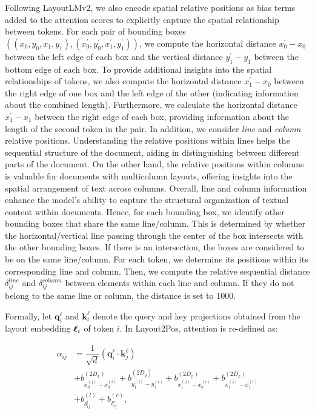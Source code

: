 Following LayoutLMv2, we also encode spatial relative positions as bias terms added to the attention scores to explicitly capture the spatial relationship between tokens. For each pair of bounding boxes $((x_0, y_0, x_1, y_1), (x^{\prime}_0, y^{\prime}_0, x^{\prime}_1, y^{\prime}_1))$, we compute the horizontal distance $x^{\prime}_0 - x_0$ between the left edge of each box and the vertical distance $y^{\prime}_1 - y_1$ between the bottom edge of each box. To provide additional insights into the spatial relationships of tokens, we also compute the horizontal distance $x^{\prime}_1 - x_0$ between the right edge of one box and the left edge of the other (indicating information about the combined length). Furthermore, we calculate the horizontal distance $x^{\prime}_1 - x_1$ between the right edge of each box, providing information about the length of the second token in the pair. In addition, we consider \textit{line} and \textit{column} relative positions. Understanding the relative positions within lines helps the sequential structure of the document, aiding in distinguishing between different parts of the document. On the other hand, the relative positions within columns is valuable for documents with multicolumn layouts, offering insights into the spatial arrangement of text across columns. Overall, line and column information enhance the model's ability to capture the structural organization of textual content within documents. Hence, for each bounding box, we identify other bounding boxes that share the same line/column. This is determined by whether the horizontal/vertical line passing through the center of the box intersects with the other bounding boxes. If there is an intersection, the boxes are considered to be on the same line/column. For each token, we determine its positions within its corresponding line and column. Then, we compute the relative sequential distance $\delta^{line}_{ij}$ and $\delta^{column}_{ij}$ between elements within each line and column. If they do not belong to the same line or column, the distance is set to 1000. 

Formally, let $\bm{q}^{\ell}_i$ and $\bm{k}^{\ell}_i$ denote the query and key projections obtained from the layout embedding $\boldsymbol{\ell}_i$ of token $i$. In Layout2Pos, attention is re-defined as:

\begin{equation}
  \begin{split}
  \alpha_{ij} &= \dfrac{1}{\sqrt{d}} \left(\bm{q}^{\ell}_i \cdot \bm{k}^{\ell}_j\right) \\
              & + b^{(2D_x)}_{x^{(j)}_{0} - x^{(i)}_{0}} + b^{(2D_y)}_{y^{(j)}_{1} - y^{(i)}_{1}} + b^{(2D_x)}_{x^{(j)}_{1} - x^{(i)}_{0}} + b^{(2D_x)}_{x^{(j)}_{1} - x^{(i)}_{1}} \\
              & + b^{(l)}_{\delta^{l}_{ij}}  + b^{(c)}_{\delta^{c}_{ij}},
  \end{split}
  \label{eq:layout2pos-attention}
\end{equation}

